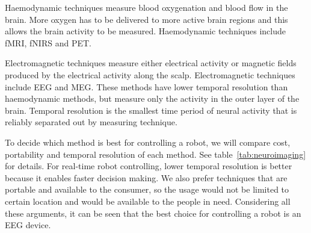 Haemodynamic techniques measure blood oxygenation and blood flow in the brain. More oxygen has to be delivered to more active brain regions and this allows the brain activity to be measured. Haemodynamic techniques include \gls{fMRI}, \gls{fNIRS} and \gls{PET}.

Electromagnetic techniques measure either electrical activity or magnetic fields produced by the electrical activity along the scalp. Electromagnetic techniques include \gls{EEG} and \gls{MEG}. These methods have lower temporal resolution than haemodynamic methods, but measure only the activity in the outer layer of the brain. Temporal resolution is the smallest time period of neural activity that is reliably separated out by measuring technique.

To decide which method is best for controlling a robot, we will compare cost, portability and temporal resolution of each method. See table~\ref{tab:neuroimaging} for details. For real-time robot controlling, lower temporal resolution is better because it enables faster decision making. We also prefer techniques that are portable and available to the consumer, so the usage would not be limited to certain location and would be available to the people in need. Considering all these arguments, it can be seen that the best choice for controlling a robot is an \gls{EEG} device.


\newcommand{\pMEG}{\tablefootnote{http://neurogadget.com/2012/12/15/inexpensive-magnetoencephalography-meg-system-could-be-available-at-every-hospital/6495}}
\newcommand{\pfMRI}{\tablefootnote{http://info.blockimaging.com/bid/92623/MRI-Machine-Cost-and-Price-Guide}}
\newcommand{\pPET}{\tablefootnote{http://info.blockimaging.com/bid/68875/How-Much-Does-a-PET-CT-Scanner-Cost}}
\newcommand{\pEEG}{\tablefootnote{http://en.wikipedia.org/wiki/Comparison\_of\_consumer\_brain-computer\_interfaces}}
\newcommand{\pNIRS}{\cite{NIRS}}
\newcommand{\tresol}{\cite{timeresol}}


